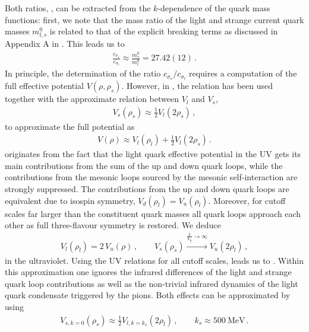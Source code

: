 \documentclass[aps,twocolumn,prd,superscriptaddress]{revtex4-2}
\begin{document}
Both ratios, , can be extracted from the $k$-dependence of the quark mass functions: first, we note that the mass ratio of the light and strange current quark masses $m_{l,s}^0$ is related to that of the explicit breaking terms as discussed in Appendix A in \cite{Fu:2019hdw}. This leads us to 
%
\begin{align}
	\frac{c_{\sigma_ s}}{c_{\sigma_l}}\approx 	\frac{ m_s^0}{m_l^0}= 27.42(12)\,. 
	\label{eq:massratioCurrent}
\end{align}
%
In principle, the determination of the ratio $c_{\sigma_ s}/c_{\sigma_l}$ requires a computation of the full effective potential $V(\rho, \rho_s)$. 
However, in \cite{Fu:2019hdw}, the relation  has been used together with the approximate relation between $V_l$ and $V_s$, 
%
\begin{align} 
	V_s(\rho_s) \approx  \frac{1}{2}  V_l(2  \rho_s)\,,
	\label{eq:Vs-V}
\end{align}
%
to approximate the full potential as
%
\begin{align} 
	V(\rho) \approx  V_l( \rho_l) +\frac{1}{2}  V_l(2  \rho_s)\,.
	\label{eq:VfullVl+Vs}
\end{align}
%
 originates from the fact that the light quark effective potential in the UV gets its main contributions from the sum of the up and down quark loops, while the contributions from the mesonic loops sourced by the mesonic self-interaction are strongly suppressed. The contributions from the up and down quark loops are equivalent due to isospin symmetry, $V_d(\rho_l)=V_u(\rho_l)$. Moreover, for cutoff scales far larger than the constituent quark masses all quark loops approach each other as full three-flavour symmetry is restored. We deduce 
%
\begin{align} 
	V_l(\rho_l) = 2\, V_u(\rho)\,, \qquad V_s(\rho_s ) \stackrel{\frac{k}{k_\chi}\to\infty}{\longrightarrow}  V_u(2 \rho_l)  \,,  
	\label{eq:UVVuVdVs}
\end{align} 
%
in the ultraviolet. Using the UV relations  for all cutoff scales, 
leads us to . Within this approximation one ignores the infrared differences of the light and strange quark loop contributions as well as the non-trivial infrared dynamics of the light quark condensate triggered by the pions. Both effects can be approximated by using 
%
\begin{align} 
	V_{s,k=0}(\rho_s ) \approx  \frac12 V_{l,k= k_s}(2 \rho_l)\,,\qquad  k_s\approx \qty{500}{\MeV}\,. 
	\label{eq:Vsks}
\end{align} 
\end{document}
